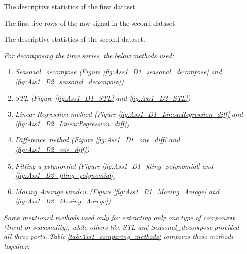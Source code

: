 \begin{table}[H]
 \centering
\caption{The descriptive statistics of the first dataset.}
\label{tab:Ass1_D1_raw_signal_summary_statistics}

\end{table}

\begin{table}[H]
 \centering
\caption{The first five rows of the raw signal in the second dataset.}
\label{tab:Ass1_D2_raw_signal}

\end{table}

\begin{table}[H]
 \centering
\caption{The descriptive statistics of the second dataset.} \label{tab:Ass1_D2_raw_signal_summary_statistics}

\end{table}






\textit{For decomposing the time series, the below methods used:}
    \begin{enumerate}
    \item \textit{Seasonal\_decompose (Figure
        \ref{fig:Ass1_D1_seasonal_decompose} and \ref{fig:Ass1_D2_seasonal_decompose})}
        
    \item \textit{STL (Figure
        \ref{fig:Ass1_D1_STL} and \ref{fig:Ass1_D2_STL})}
        
    \item \textit{Linear Regression method (Figure
        \ref{fig:Ass1_D1_LinearRegression_diff} and \ref{fig:Ass1_D2_LinearRegression_diff})}
        
    \item \textit{Difference method (Figure
        \ref{fig:Ass1_D1_one_diff} and \ref{fig:Ass1_D2_one_diff})}
        
    \item \textit{Fitting a polynomial (Figure
        \ref{fig:Ass1_D1_fiting_polynomial} and \ref{fig:Ass1_D2_fiting_polynomial})}
        
    \item \textit{Moving Average window (Figure
        \ref{fig:Ass1_D1_Moving_Avrage} and \ref{fig:Ass1_D2_Moving_Avrage})}

    \end{enumerate}

\textit{\newline \newline Some mentioned methods used only for extracting only one type of component (trend or seasonality), while others like STL and Seasonal\_decompose provided all three parts. Table \ref{tab:Ass1_comparing_methods} compares these methods together.}

